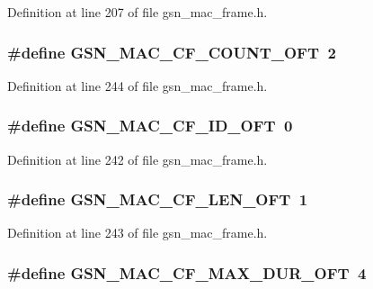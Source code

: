 Definition at line 207 of file gsn\_\-mac\_\-frame.h.

\hypertarget{a00523_aed9216d1b3365fd9b606c600539f068c}{
\subsubsection[{GSN\_\-MAC\_\-CF\_\-COUNT\_\-OFT}]{\setlength{\rightskip}{0pt plus 5cm}\#define GSN\_\-MAC\_\-CF\_\-COUNT\_\-OFT~2}}
\label{a00523_aed9216d1b3365fd9b606c600539f068c}


Definition at line 244 of file gsn\_\-mac\_\-frame.h.

\hypertarget{a00523_aabe75cd1f04b055917e4c7e0cacb2f4c}{
\subsubsection[{GSN\_\-MAC\_\-CF\_\-ID\_\-OFT}]{\setlength{\rightskip}{0pt plus 5cm}\#define GSN\_\-MAC\_\-CF\_\-ID\_\-OFT~0}}
\label{a00523_aabe75cd1f04b055917e4c7e0cacb2f4c}


Definition at line 242 of file gsn\_\-mac\_\-frame.h.

\hypertarget{a00523_ab48fe2d0b2bfdffa6f83e01f1702a719}{
\subsubsection[{GSN\_\-MAC\_\-CF\_\-LEN\_\-OFT}]{\setlength{\rightskip}{0pt plus 5cm}\#define GSN\_\-MAC\_\-CF\_\-LEN\_\-OFT~1}}
\label{a00523_ab48fe2d0b2bfdffa6f83e01f1702a719}


Definition at line 243 of file gsn\_\-mac\_\-frame.h.

\hypertarget{a00523_a4455cd3140dc5fedab387dd70a7d4997}{
\subsubsection[{GSN\_\-MAC\_\-CF\_\-MAX\_\-DUR\_\-OFT}]{\setlength{\rightskip}{0pt plus 5cm}\#define GSN\_\-MAC\_\-CF\_\-MAX\_\-DUR\_\-OFT~4}}
\label{a00523_a4455cd3140dc5fedab387dd70a7d4997}


